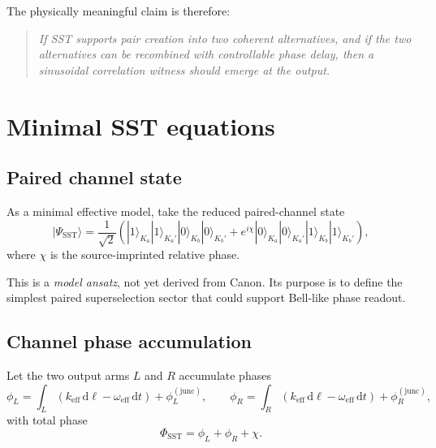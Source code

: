 \documentclass[11pt]{article}
\newcommand{\dd}{\mathrm{d}}
\begin{document}
            The physically meaningful claim is therefore:
            
            \begin{quote}
                \emph{If SST supports pair creation into two coherent alternatives, and if the two alternatives can be recombined with controllable phase delay, then a sinusoidal correlation witness should emerge at the output.}
            \end{quote}
    
    \section{Minimal SST equations}
        
        \subsection{Paired channel state}
            
            As a minimal effective model, take the reduced paired-channel state
            \begin{equation}
                |\Psi_{\mathrm{SST}}\rangle
                =
                \frac{1}{\sqrt{2}}
                \left(
                    |1\rangle_{K_a}|1\rangle_{K_a'}|0\rangle_{K_b}|0\rangle_{K_b'}
                    +
                    e^{i\chi}
                    |0\rangle_{K_a}|0\rangle_{K_a'}|1\rangle_{K_b}|1\rangle_{K_b'}
                \right),
                \label{eq:sst_state}
            \end{equation}
            where \(\chi\) is the source-imprinted relative phase.
            
            This is a \emph{model ansatz}, not yet derived from Canon. Its purpose is to define the simplest paired superselection sector that could support Bell-like phase readout.
        
        \subsection{Channel phase accumulation}
            
            Let the two output arms \(L\) and \(R\) accumulate phases
            \begin{equation}
                \phi_L = \int_{L} \left( k_{\mathrm{eff}}\,\dd \ell - \omega_{\mathrm{eff}}\,\dd t \right) + \phi_L^{\mathrm{(junc)}},
                \qquad
                \phi_R = \int_{R} \left( k_{\mathrm{eff}}\,\dd \ell - \omega_{\mathrm{eff}}\,\dd t \right) + \phi_R^{\mathrm{(junc)}},
                \label{eq:path_phases}
            \end{equation}
            with total phase
            \begin{equation}
                \Phi_{\mathrm{SST}} = \phi_L + \phi_R + \chi.
                \label{eq:PhiSST}
            \end{equation}
            
\end{document}
